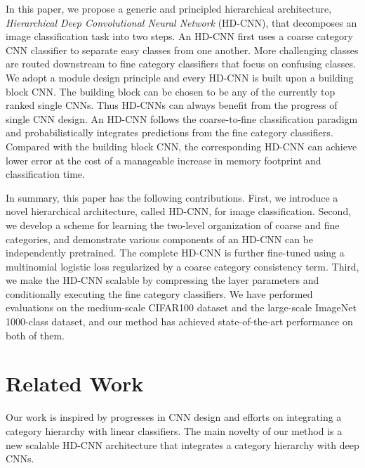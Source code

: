 \documentclass[10pt,twocolumn,letterpaper]{article}
\begin{document}
In this paper, we propose a generic and principled hierarchical architecture, \textit{Hierarchical Deep Convolutional Neural Network} (HD-CNN), that decomposes an image classification task into two steps. An HD-CNN first uses a coarse category CNN classifier to separate easy classes from one another. More challenging classes are routed downstream to fine category classifiers that focus on confusing classes. We adopt a module design principle and every HD-CNN is built upon a building block CNN. The building block can be chosen to be any of the currently top ranked single CNNs. Thus HD-CNNs can always benefit from the progress of single CNN design. An HD-CNN follows the coarse-to-fine classification paradigm and probabilistically integrates predictions from the fine category classifiers. Compared with the building block CNN, the corresponding HD-CNN can achieve lower error at the cost of a manageable increase in memory footprint and classification time.

In summary, this paper has the following contributions. First, we introduce a novel hierarchical architecture, called HD-CNN, for image classification. Second, we develop a scheme for learning the two-level organization of coarse and fine categories, and demonstrate various components of an HD-CNN can be independently pretrained. The complete HD-CNN is further fine-tuned using a multinomial logistic loss regularized by a coarse category consistency term. Third, we make the HD-CNN scalable by compressing the layer parameters and conditionally executing the fine category classifiers. We have performed evaluations on the medium-scale CIFAR100 dataset and the large-scale ImageNet 1000-class dataset, and our method has achieved state-of-the-art performance on both of them.





























\section{Related Work}
\label{sec:related}
Our work is inspired by progresses in CNN design and efforts on integrating a category hierarchy with linear classifiers. The main novelty of our method is a new scalable HD-CNN architecture that integrates a category hierarchy with deep CNNs.
\end{document}

